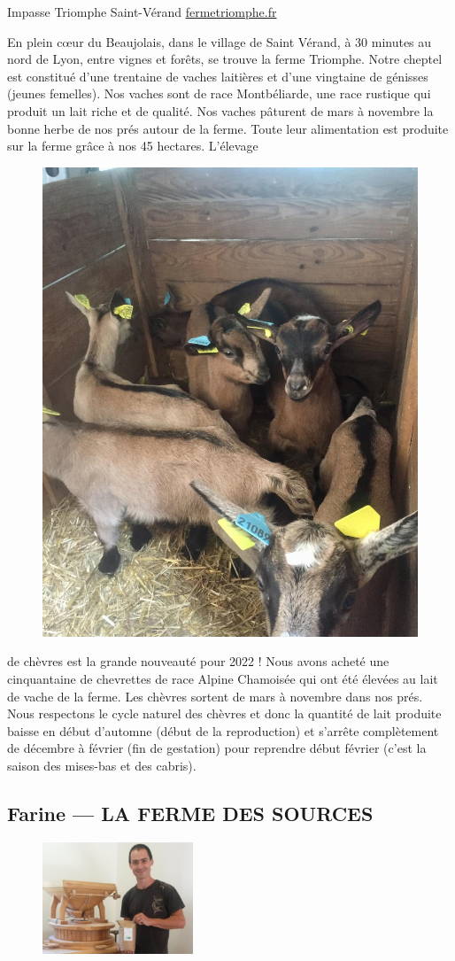 \documentclass[10pt,a4paper,french]{article}
\makeatletter
\newcommand{\authoredby}[1]{\addtocontents{toc}{\protect\@nameuse{authoredby#1}}}%
\makeatother
\begin{document}
 Impasse Triomphe Saint-Vérand\newline
\href{https://fermetriomphe.fr/}{fermetriomphe.fr}\newline

\noindent En plein c{\oe}ur du Beaujolais, dans le village de Saint Vérand, à 30
minutes au nord de Lyon, entre vignes et forêts, se trouve la ferme
Triomphe.  Notre cheptel est constitué d'une trentaine de vaches
laitières et d'une vingtaine de génisses (jeunes femelles). Nos vaches
sont de race Montbéliarde, une race rustique qui produit un lait riche
et de qualité. Nos vaches pâturent de mars à novembre la bonne herbe
de nos prés autour de la ferme. Toute leur alimentation est produite
sur la ferme grâce à nos 45 hectares.  L'élevage\newline

\begin{figure}
\includegraphics[height=0.3\textwidth]{TRIOMPHE2.jpg}
\end{figure}

\noindent de chèvres est la grande nouveauté pour 2022 ! Nous avons acheté une
cinquantaine de chevrettes de race Alpine Chamoisée qui ont été
élevées au lait de vache de la ferme.  Les chèvres sortent de mars à
novembre dans nos prés.  Nous respectons le cycle naturel des chèvres
et donc la quantité de lait produite baisse en début d'automne (début
de la reproduction) et s'arrête complètement de décembre à février
(fin de gestation) pour reprendre début février (c'est la saison des
mises-bas et des cabris).

\vspace{10em}

\authoredby{B}
\subsection{Farine --- LA FERME DES SOURCES}\label{subsec:farine}

\begin{figure}
\includegraphics[width=0.4\textwidth]{BERNARD.jpg}
\end{figure}
\end{document}
